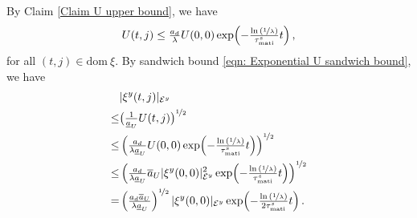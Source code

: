  By Claim \ref{Claim U upper bound}, we have 
 \begin{equation*}
     U(t,j) \leq \tfrac{a_d}{\lambda}U(0,0)  \exp \!\left(-\tfrac{\ln{(\nicefrac{1}{\lambda})}}{\tau_{\text{mati}}^s}t \right),
 \end{equation*}
 for all $(t,j) \in \text{dom} \ \xi$.
 By sandwich bound \eqref{eqn: Exponential U sandwich bound}, we have
 \begin{equation*}
     \begin{aligned}
         &|\xi^y(t,j)|_{\mathcal{E}^y}  \\
         \leq & \big(\tfrac{1}{\underline{a}_U} U(t,j)\big)^{\nicefrac{1}{2}} \\
         \leq & \left(\tfrac{a_d}{\lambda \underline{a}_U}U(0,0)  \exp \!\left(-\tfrac{\ln{(\nicefrac{1}{\lambda})}}{\tau_{\text{mati}}^s}t \right) \right)^{\nicefrac{1}{2}} \\
         \leq & \left(\tfrac{a_d}{\lambda \underline{a}_U} \overline{a}_U |\xi^y(0,0)|_{\mathcal{E}^y}^2  \exp \!\left(-\tfrac{\ln{(\nicefrac{1}{\lambda})}}{\tau_{\text{mati}}^s}t \right) \right)^{\nicefrac{1}{2}} \\    
         = & \left(\tfrac{a_d \overline{a}_U}{\lambda \underline{a}_U} \right)^{\nicefrac{1}{2}}  |\xi^y(0,0)|_{\mathcal{E}^y}  \exp \!\left(-\tfrac{\ln{(\nicefrac{1}{\lambda})}}{2 \tau_{\text{mati}}^s}t \right).
     \end{aligned}
 \end{equation*}

